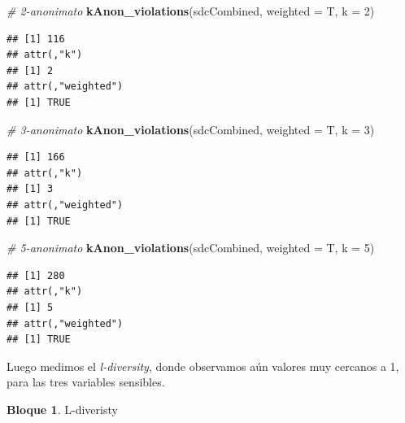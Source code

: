 \documentclass[]{book}
\newenvironment{Shaded}{\begin{snugshade}}{\end{snugshade}}
\newcommand{\CommentTok}[1]{\textcolor[rgb]{0.56,0.35,0.01}{\textit{#1}}}
\newcommand{\DataTypeTok}[1]{\textcolor[rgb]{0.13,0.29,0.53}{#1}}
\newcommand{\DecValTok}[1]{\textcolor[rgb]{0.00,0.00,0.81}{#1}}
\newcommand{\KeywordTok}[1]{\textcolor[rgb]{0.13,0.29,0.53}{\textbf{#1}}}
\newcommand{\NormalTok}[1]{#1}
\newcommand{\OperatorTok}[1]{\textcolor[rgb]{0.81,0.36,0.00}{\textbf{#1}}}
\newcommand{\OtherTok}[1]{\textcolor[rgb]{0.56,0.35,0.01}{#1}}
\newcommand{\StringTok}[1]{\textcolor[rgb]{0.31,0.60,0.02}{#1}}
\theoremstyle{definition}
\theoremstyle{definition}
\newtheorem{example}{Bloque}[chapter]
\theoremstyle{definition}
\theoremstyle{definition}
\theoremstyle{remark}
\begin{document}
\begin{Shaded}
\begin{Highlighting}[]
\CommentTok{# 2-anonimato}
\KeywordTok{kAnon_violations}\NormalTok{(sdcCombined, }\DataTypeTok{weighted =}\NormalTok{ T, }\DataTypeTok{k =} \DecValTok{2}\NormalTok{) }
\end{Highlighting}
\end{Shaded}

\begin{verbatim}
## [1] 116
## attr(,"k")
## [1] 2
## attr(,"weighted")
## [1] TRUE
\end{verbatim}

\begin{Shaded}
\begin{Highlighting}[]
\CommentTok{# 3-anonimato}
\KeywordTok{kAnon_violations}\NormalTok{(sdcCombined, }\DataTypeTok{weighted =}\NormalTok{ T, }\DataTypeTok{k =} \DecValTok{3}\NormalTok{) }
\end{Highlighting}
\end{Shaded}

\begin{verbatim}
## [1] 166
## attr(,"k")
## [1] 3
## attr(,"weighted")
## [1] TRUE
\end{verbatim}

\begin{Shaded}
\begin{Highlighting}[]
\CommentTok{# 5-anonimato}
\KeywordTok{kAnon_violations}\NormalTok{(sdcCombined, }\DataTypeTok{weighted =}\NormalTok{ T, }\DataTypeTok{k =} \DecValTok{5}\NormalTok{) }
\end{Highlighting}
\end{Shaded}

\begin{verbatim}
## [1] 280
## attr(,"k")
## [1] 5
## attr(,"weighted")
## [1] TRUE
\end{verbatim}

Luego medimos el \emph{l-diversity}, donde observamos aún valores muy cercanos a 1, para las tres variables sensibles.

\begin{example}
\protect\hypertarget{exm:bloque57nbm}{}{\label{exm:bloque57nbm} }L-diveristy
\end{example}

\begin{Shaded}
\end{Shaded}
\end{document}
